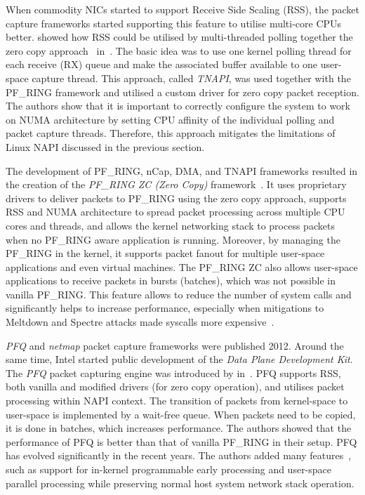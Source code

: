 When commodity NICs started to support Receive Side Scaling (RSS), the packet capture frameworks started supporting this feature to utilise multi-core CPUs better. \citeauthor{Fusco-2010-High} showed how RSS could be utilised by multi-threaded polling together the zero copy approach~\cite{Fusco-2010-High} in~\citeyear{Fusco-2010-High}. The basic idea was to use one kernel polling thread for each receive (RX) queue and make the associated buffer available to one user-space capture thread. This approach, called \emph{TNAPI}, was used together with the PF\_RING framework and utilised a custom driver for zero copy packet reception. The authors show that it is important to correctly configure the system to work on NUMA architecture by setting CPU affinity of the individual polling and packet capture threads. Therefore, this approach mitigates the limitations of Linux NAPI discussed in the previous section. 

The development of PF\_RING, nCap, DMA, and TNAPI frameworks resulted in the creation of the \emph{PF\_RING ZC (Zero Copy)} framework~\cite{ntop--PFRING}. It uses proprietary drivers to deliver packets to PF\_RING using the zero copy approach, supports RSS and NUMA architecture to spread packet processing across multiple CPU cores and threads, and allows the kernel networking stack to process packets when no PF\_RING aware application is running. Moreover, by managing the PF\_RING in the kernel, it supports packet fanout for multiple user-space applications and even virtual machines. The PF\_RING ZC also allows user-space applications to receive packets in bursts (batches), which was not possible in vanilla PF\_RING. This feature allows to reduce the number of system calls and significantly helps to increase performance, especially when mitigations to Meltdown and Spectre attacks made syscalls more expensive~\cite{Gregg-2018-KPTIKAISER}.

\emph{PFQ} and \emph{netmap} packet capture frameworks were published 2012. Around the same time, Intel started public development of the \emph{Data Plane Development Kit}. The \emph{PFQ} packet capturing engine was introduced by \citeauthor{Bonelli-2012-Multi} in~\cite{Bonelli-2012-Multi}. PFQ supports RSS, both vanilla and modified drivers (for zero copy operation), and utilises packet processing within NAPI context. The transition of packets from kernel-space to user-space is implemented by a wait-free queue. When packets need to be copied, it is done in batches, which increases performance. The authors showed that the performance of PFQ is better than that of vanilla PF\_RING in their setup. PFQ has evolved significantly in the recent years. The authors added many features~\cite{Bonelli-2014-Purely, Bonelli-2016-Network, Bonelli-2017-Enabling}, such as support for in-kernel programmable early processing and user-space parallel processing while preserving normal host system network stack operation.


